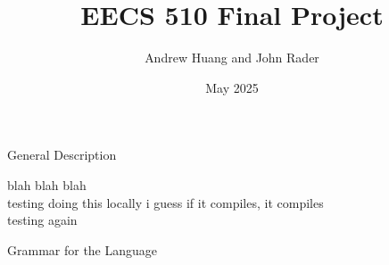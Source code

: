 \documentclass{article}
\title{EECS 510 Final Project}
\author{Andrew Huang and John Rader}
\date{May 2025}
\begin{document}
\maketitle


\begin{mylist}

\item General Description

blah blah blah \\
testing doing this locally i guess if it compiles, it compiles \\
testing again

\item Grammar for the Language


\end{mylist}
\end{document}
